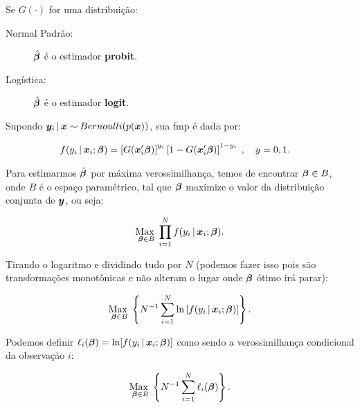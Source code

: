 \documentclass[11pt, oneside, a4paper, article]{article}
\numberwithin{equation}{section}
\begin{document}
\begin{description}
	Se $G(\cdot)$ for uma distribuição:

	\begin{description}
		\item [Normal Padrão:] $\hat{\boldsymbol{\beta}}$ é o estimador \textbf{probit}.
		\item [Logística:] $\hat{\boldsymbol{\beta}}$ é o estimador \textbf{logit}.
	\end{description}

	Supondo $\boldsymbol{y}_{i} \, | \, \boldsymbol{x} \sim Bernoulli(p(\boldsymbol{x}))$, sua fmp é dada por:

	\vspace{-1 em}
	\begin{align*}
		f( y_{i} \, | \, \boldsymbol{x}_{i} ; \boldsymbol{\beta} ) 
		&= 
		\left[ G(\boldsymbol{x}_{i}' \boldsymbol{\beta} )  \right]^{y_{i}}
		\left[ 1 - G(\boldsymbol{x}_{i}' \boldsymbol{\beta} )  \right]^{1 - y_{i}}
		\; , \quad y=0,1.
	\end{align*}

	Para estimarmos $\hat{\boldsymbol{\beta}}$ por máxima verossimilhança, temos de encontrar $\boldsymbol{\beta} \in B$, onde $B$ é o espaço paramétrico, tal que $\boldsymbol{\beta}$ maximize o valor da distribuição conjunta de $\boldsymbol{y}$, ou seja:

	\vspace{-1 em}
	\begin{align*}
		\underset{\boldsymbol{\beta} \in B}{\text{Max }} 
		\prod_{i=1}^{N}
		f( y_{i} \, | \, \boldsymbol{x}_{i} ; \boldsymbol{\beta} ).
	\end{align*}

	\noindent

	Tirando o logaritmo e dividindo tudo por $N$ (podemos fazer isso pois são transformações monotônicas e não alteram o lugar onde $\boldsymbol{\beta}$ ótimo irá parar):

	\vspace{-1 em}
	\begin{align*}
		\underset{\boldsymbol{\beta} \in B}{\text{Max }} 
		\left\{ 
			N^{-1} \sum_{i=1}^{N}
			\ln \left[ f( y_{i} \, | \, \boldsymbol{x}_{i} ; \boldsymbol{\beta} ) \right]
		\right\}.
	\end{align*}

	\noindent
	Podemos definir
	$\ell_{i}( \boldsymbol{\beta} ) = \ln[ f( y_{i} \, | \, \boldsymbol{x}_{i} ; \boldsymbol{\beta} ) ]$
	como sendo a verossimilhança condicional da observação $i$:

	\vspace{-1 em}
	\begin{align*}
		\underset{\boldsymbol{\beta} \in B}{\text{Max }} 
		\left\{ 
			N^{-1} \sum_{i=1}^{N} \ell_{i} (\boldsymbol{\beta})
		\right\}.
	\end{align*}


\end{description}
\end{document}
